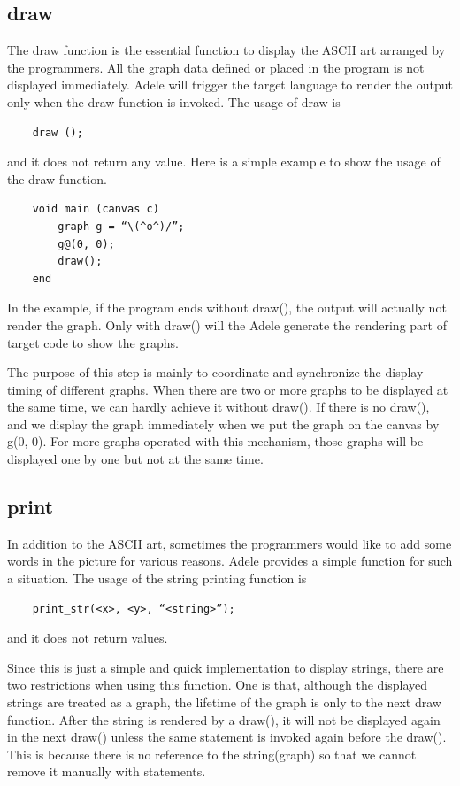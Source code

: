 \documentclass[11pt,letterpaper]{article}
\begin{document}
\subsection {draw}
The draw function is the essential function to display the ASCII art arranged by the programmers. All the graph data defined or placed in the program is not displayed immediately. Adele will trigger the target language to render the output only when the draw function is invoked. The usage of draw is
\begin{lstlisting}
	draw ();
\end{lstlisting}
and it does not return any value. Here is a simple example to show the usage of the draw function.

\begin{lstlisting}
	void main (canvas c)
		graph g = “\(^o^)/”;
		g@(0, 0);
		draw();
	end
\end{lstlisting}

In the example, if the program ends without draw(), the output will actually not render the graph. Only with draw() will the Adele generate the rendering part of target code to show the graphs.

The purpose of this step is mainly to coordinate and synchronize the display timing of different graphs. When there are two or more graphs to be displayed at the same time, we can hardly achieve it without draw(). If there is no draw(), and we display the graph immediately when we put the graph on the canvas by g\@(0, 0). For more graphs operated with this mechanism, those graphs will be displayed one by one but not at the same time.

\subsection {print}
In addition to the ASCII art, sometimes the programmers would like to add some words in the picture for various reasons. Adele provides a simple function for such a situation. The usage of the string printing function is
\begin{lstlisting}
	print_str(<x>, <y>, “<string>”);
\end{lstlisting}
and it does not return values.

Since this is just a simple and quick implementation to display strings, there are two restrictions when using this function. One is that, although the displayed strings are treated as a graph, the lifetime of the graph is only to the next draw function. After the string is rendered by a draw(), it will not be displayed again in the next draw() unless the same statement is invoked again before the draw(). This is because there is no reference to the string(graph) so that we cannot remove it manually with statements.
\end{document}
